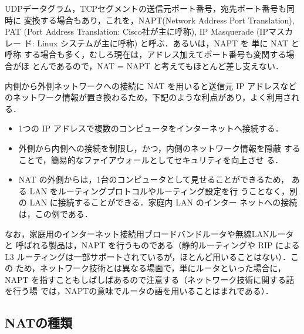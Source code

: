 UDPデータグラム，TCPセグメントの送信元ポート番号，宛先ポート番号も同時に
変換する場合もあり，これを，NAPT(Network Address Port Translation), PAT
(Port Address Translation: Cisco社が主に呼称), IP Masquerade (IPマスカレー
ド: Linux システムが主に呼称) と呼ぶ．あるいは，NAPT を 単に NAT と呼称
する場合も多く，むしろ現在は，アドレス加えてポート番号も変関する場合がほ
とんであるので，NAT = NAPT と考えてもほとんど差し支えない．

内側から外側ネットワークへの接続に NAT を用いると送信元 IP アドレスなど
のネットワーク情報が置き換わるため，下記のような利点があり，よく利用され
る．

\begin{itemize}
 \item 1つの IP アドレスで複数のコンピュータをインターネットへ接続する．
 \item 外側から内側への接続を制限し，かつ，内側のネットワーク情報を隠蔽
       することで，簡易的なファイアウォールとしてセキュリティを向上させ
       る．
 \item NAT の外側からは，1台のコンピュータとして見せることができるため，
       ある LAN をルーティングプロトコルやルーティング設定を行
       うことなく，別の LAN に接続することができる．家庭内 LAN のインター
       ネットへの接続は，この例である．
\end{itemize}

なお，家庭用のインターネット接続用ブロードバンドルータや無線LANルータと
呼ばれる製品は，NAPT を行うものである（静的ルーティングや RIP による L3 
ルーティングは一部サポートされているが，ほとんど用いることはない）．この
ため，ネットワーク技術とは異なる場面で，単にルータといった場合に，NAPT 
を指すこともしばしばあるので注意する（ネットワーク技術に関する話を行う場
では，NAPTの意味でルータの語を用いることはまれである）．

\subsection*{NATの種類}

